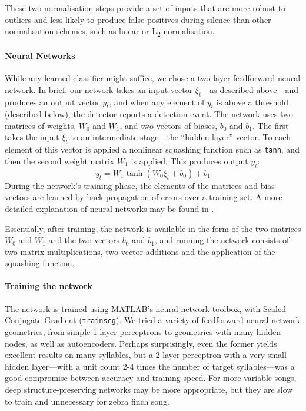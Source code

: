 \documentclass[10pt,letterpaper]{article}
\renewcommand{\subsubsection}[1]{\paragraph{#1}}
\begin{document}
These two normalisation steps provide a set of inputs that are more
robust to outliers and less likely to produce false positives during
silence than other normalisation schemes, such as linear or
L\textsubscript{2} normalisation.

\subsubsection{Neural Networks}

While any learned classifier might suffice, we chose a two-layer
feedforward neural network.  In brief, our network takes an input
vector $\xi_t$---as described above---and produces an output vector
$y_t$, and when any element of $y_t$ is above a threshold (described
below), the detector reports a detection event.  The network uses two
matrices of weights, $W_0$ and $W_1$, and two vectors of biases, $b_0$
and $b_1$.  The first takes the input $\xi_t$ to an intermediate
stage---the ``hidden layer'' vector.  To each element of this vector
is applied a nonlinear squashing function such as {\tt tanh}, and then
the second weight matrix $W_1$ is applied.  This produces output
$y_t$:
\begin{equation*}
  y_t = W_1 \tanh (W_0 \xi_t + b_0) + b_1
\end{equation*}
During the network's training phase, the elements of the matrices and
bias vectors are learned by back-propagation of errors over a training
set.  A more detailed explanation of neural networks may be found in
\cite{hkp}.

Essentially, after training, the network is available in the form of
the two matrices $W_0$ and $W_1$ and the two vectors $b_0$ and $b_1$,
and running the network consists of two matrix multiplications, two
vector additions and the application of the squashing function.

\subsubsection{Training the network}

The network is trained using MATLAB's neural network toolbox, with
Scaled Conjugate Gradient ({\tt trainscg}). We tried a variety of
feedforward neural network geometries, from simple 1-layer perceptrons
to geometries with many hidden nodes, as well as autoencoders. Perhaps
surprisingly, even the former yields excellent results on many
syllables, but a 2-layer perceptron with a very small hidden
layer---with a unit count 2-4 times the number of target
syllables---was a good compromise between accuracy and training
speed. For more variable songs, deep structure-preserving networks may
be more appropriate, but they are slow to train and unnecessary for
zebra finch song.
\end{document}
